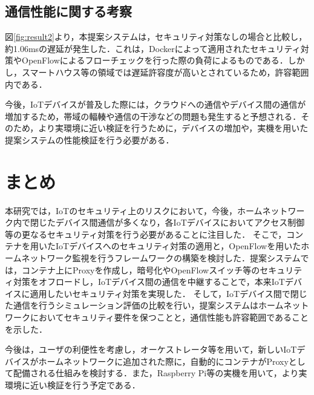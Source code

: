 \documentclass[Japanese]{dicomopapers}
\begin{document}
\subsection{通信性能に関する考察}
図\ref{fig:result2}より，本提案システムは，セキュリティ対策なしの場合と比較し，約1.06msの遅延が発生した．これは，Dockerによって適用されたセキュリティ対策やOpenFlowによるフローチェックを行った際の負荷によるものである．しかし，スマートハウス等の領域では遅延許容度が高いとされている\cite{latency}ため，許容範囲内である．\par
今後，IoTデバイスが普及した際には，クラウドへの通信やデバイス間の通信が増加するため，帯域の輻輳や通信の干渉などの問題も発生すると予想される．そのため，より実環境に近い検証を行うために，デバイスの増加や，実機を用いた提案システムの性能検証を行う必要がある．

\section{まとめ}
本研究では，IoTのセキュリティ上のリスクにおいて，今後，ホームネットワーク内で閉じたデバイス間通信が多くなり，各IoTデバイスにおいてアクセス制御等の更なるセキュリティ対策を行う必要があることに注目した．
そこで，コンテナを用いたIoTデバイスへのセキュリティ対策の適用と，OpenFlowを用いたホームネットワーク監視を行うフレームワークの構築を検討した．提案システムでは，コンテナ上にProxyを作成し，暗号化やOpenFlowスイッチ等のセキュリティ対策をオフロードし，IoTデバイス間の通信を中継することで，本来IoTデバイスに適用したいセキュリティ対策を実現した．
そして，IoTデバイス間で閉じた通信を行うシミュレーション評価の比較を行い，提案システムはホームネットワークにおいてセキュリティ要件を保つことと，通信性能も許容範囲であることを示した．\par
今後は，ユーザの利便性を考慮し，オーケストレータ等を用いて，新しいIoTデバイスがホームネットワークに追加された際に，自動的にコンテナがProxyとして配備される仕組みを検討する．また，Raspberry Pi等の実機を用いて，より実環境に近い検証を行う予定である．
\end{document}
